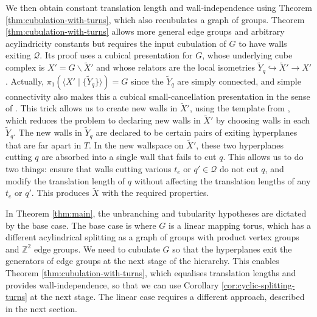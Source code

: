 \documentclass[11pt,oneside]{amsart}
\theoremstyle{definition}
\newcommand{\field}[1]{\mathbb{#1}}
\newcommand{\integers}{\ensuremath{\field{Z}}}
\begin{document}

We then obtain constant translation length and wall-independence using Theorem \ref{thm:cubulation-with-turns}, which also recubulates a graph of groups. Theorem \ref{thm:cubulation-with-turns} allows more general edge groups and arbitrary acylindricity constants but requires the input cubulation of $G$ to have walls exiting $\mathcal Q$.  Its proof uses a cubical presentation for $G$, whose underlying cube complex is $X'=G\backslash\widetilde X'$ and whose relators are the local isometries $\widetilde Y_q\hookrightarrow\widetilde X'\to X'$.  Actually, $\pi_1(\langle X'\mid \{\widetilde Y_q\}\rangle)=G$ since the $\widetilde Y_q$ are simply connected, and simple connectivity also makes this a cubical small-cancellation presentation in the sense of \cite{Wise:QCH}.  This trick allows us to create new walls in $\widetilde X'$, using the template from \cite[Sec. 5]{Wise:QCH}, which reduces the problem to declaring new walls in $\widetilde X'$ by choosing walls in each $\widetilde Y_q$.  The new walls in $\widetilde Y_q$ are declared to be certain pairs of exiting hyperplanes that are far apart in $T$.  In the new wallspace on $\widetilde X'$, these two hyperplanes cutting $q$ are absorbed into a single wall that fails to cut $q$.  This allows us to do two things: ensure that walls cutting various $t_e$ or $q'\in\mathcal Q$ do not cut $q$, and modify the translation length of $q$ without affecting the translation lengths of any $t_e$ or $q'$.  This produces  $\widetilde X$ with the required properties.


In Theorem \ref{thm:main}, the unbranching and tubularity hypotheses are dictated by the base case.  The base case is where $G$ is a linear mapping torus, which has a different acylindrical splitting as a graph of groups with product vertex groups and $\integers^2$ edge groups.  We need to cubulate $G$ so that the hyperplanes  exit the generators of edge groups at the next stage of the hierarchy.  This enables Theorem \ref{thm:cubulation-with-turns}, which equalises translation lengths and provides wall-independence, so that we can use Corollary \ref{cor:cyclic-splitting-turns} at the next stage.  The linear case requires a different approach, described in the next section.
\end{document}
